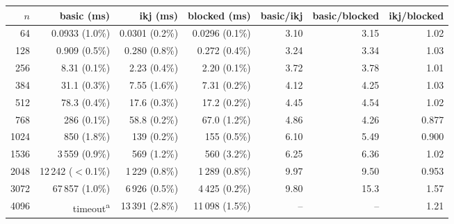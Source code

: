 \begin{tabular}{rrrrrrr}
\toprule
$n$ & basic (ms) & ikj (ms) & blocked (ms) & basic/ikj & basic/blocked & ikj/blocked \\
\midrule
64 & 0.0933 (1.0\%) & 0.0301 (0.2\%) & 0.0296 (0.1\%) & 3.10 & 3.15 & 1.02 \\
128 & 0.909 (0.5\%) & 0.280 (0.8\%) & 0.272 (0.4\%) & 3.24 & 3.34 & 1.03 \\
256 & 8.31 (0.1\%) & 2.23 (0.4\%) & 2.20 (0.1\%) & 3.72 & 3.78 & 1.01 \\
384 & 31.1 (0.3\%) & 7.55 (1.6\%) & 7.31 (0.2\%) & 4.12 & 4.25 & 1.03 \\
512 & 78.3 (0.4\%) & 17.6 (0.3\%) & 17.2 (0.2\%) & 4.45 & 4.54 & 1.02 \\
768 & 286 (0.1\%) & 58.8 (0.2\%) & 67.0 (1.2\%) & 4.86 & 4.26 & 0.877 \\
1024 & 850 (1.8\%) & 139 (0.2\%) & 155 (0.5\%) & 6.10 & 5.49 & 0.900 \\
1536 & 3\,559 (0.9\%) & 569 (1.2\%) & 560 (3.2\%) & 6.25 & 6.36 & 1.02 \\
2048 & 12\,242 ($<$0.1\%) & 1\,229 (0.8\%) & 1\,289 (0.8\%) & 9.97 & 9.50 & 0.953 \\
3072 & 67\,857 (1.0\%) & 6\,926 (0.5\%) & 4\,425 (0.2\%) & 9.80 & 15.3 & 1.57 \\
4096 & timeout\textsuperscript{a} & 13\,391 (2.8\%) & 11\,098 (1.5\%) & -- & -- & 1.21 \\
\bottomrule
\end{tabular}
\par{}

